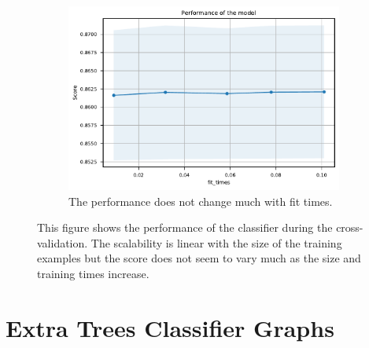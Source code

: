 \documentclass{l4proj}
\begin{document}
\begin{appendices}
\begin{figure}[htbp]
\begin{subfigure}[b]{0.70\textwidth}
        \includegraphics[width=\textwidth]{images/location/learning_curve_3_DecisionTreeLocations.pdf}
        \caption{The performance does not change much with fit times.}
        \label{fig:learning_curve_3_DecisionTreeLocations}
    \end{subfigure}
    \caption{This figure shows the performance of the classifier during the cross-validation. The scalability is linear with the size of the training examples but the score does not seem to vary much as the size and training times increase.}\label{fig:location_no_upsampling_kfold}
\end{figure}

\chapter{Extra Trees Classifier Graphs}


\end{appendices}
\end{document}
